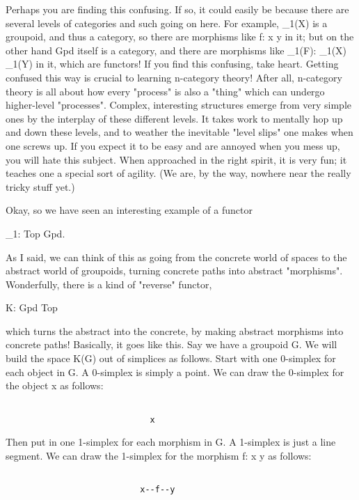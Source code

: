 Perhaps you are finding this confusing.  If so, it could easily be
because there are several levels of categories and such going on here.
For example, \Pi _{1}(X) is a groupoid, and thus a category, so
there are morphisms like f: x \to  y in it; but on the other hand Gpd
itself is a category, and there are morphisms like \Pi _{1}(F):
\Pi _{1}(X) \to  \Pi _{1}(Y) in it, which are functors!  If
you find this confusing, take heart.  Getting confused this way is
crucial to learning n-category theory!  After all, n-category theory is
all about how every "process" is also a "thing"
which can undergo higher-level "processes".  Complex,
interesting structures emerge from very simple ones by the interplay of
these different levels.  It takes work to mentally hop up and down these
levels, and to weather the inevitable "level slips" one makes
when one screws up.  If you expect it to be easy and are annoyed when
you mess up, you will hate this subject.  When approached in the right
spirit, it is very fun; it teaches one a special sort of agility.  (We
are, by the way, nowhere near the really tricky stuff yet.)

Okay, so we have seen an interesting example of a functor 
    
                     \Pi _{1}: Top \to  Gpd.   

As I said, we can think of this as going from the concrete world
of spaces to the abstract world of groupoids, turning concrete paths
into abstract "morphisms".  Wonderfully, there is a kind of "reverse"
functor,

                      K: Gpd \to  Top

which turns the abstract into the concrete, by making abstract morphisms
into concrete paths!  Basically, it goes like this.  Say we have a
groupoid G.  We will build the space K(G) out of simplices as follows.
Start with one 0-simplex for each object in G.  A 0-simplex is simply a
point.  We can draw the 0-simplex for the object x as follows:


\begin{verbatim}

                             x

\end{verbatim}
    
Then put in one 1-simplex for each morphism in G.  A 1-simplex is just a
line segment.  We can draw the 1-simplex for the morphism f: x \to  y as
follows: 


\begin{verbatim}

                           x--f--y

\end{verbatim}
    
